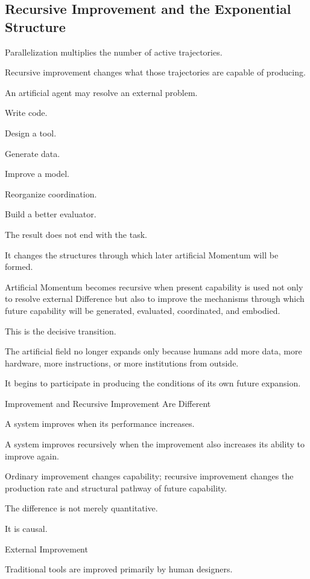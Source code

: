\subsection*{\textbf{Recursive Improvement and the Exponential Structure}} 


Parallelization multiplies the number of active trajectories.

Recursive improvement changes what those trajectories are capable of producing.

An artificial agent may resolve an external problem.

Write code.

Design a tool.

Generate data.

Improve a model.

Reorganize coordination.

Build a better evaluator.

The result does not end with the task.

It changes the structures through which later artificial Momentum will be formed.

Artificial Momentum becomes recursive when present capability is used not only to resolve external Difference but also to improve the mechanisms through which future capability will be generated, evaluated, coordinated, and embodied.

This is the decisive transition.

The artificial field no longer expands only because humans add more data, more hardware, more instructions, or more institutions from outside.

It begins to participate in producing the conditions of its own future expansion.

Improvement and Recursive Improvement Are Different

A system improves when its performance increases.

A system improves recursively when the improvement also increases its ability to improve again.

Ordinary improvement changes capability; recursive improvement changes the production rate and structural pathway of future capability.

The difference is not merely quantitative.

It is causal.

External Improvement

Traditional tools are improved primarily by human designers.

